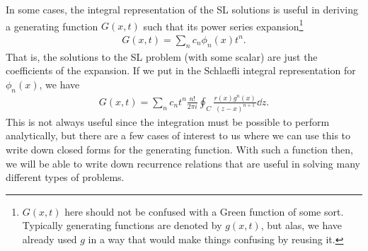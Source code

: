 In some cases, the integral representation of the SL solutions is useful in deriving a generating function $G(x,t)$ such that its power series expansion\footnote{$G(x,t)$ here should not be confused with a Green function of some sort. Typically generating functions are denoted by $g(x,t)$, but alas, we have already used $g$ in a way that would make things confusing by reusing it.}
\begin{eqnarray}
    G(x,t) = \sum_{n} c_{n} \phi_{n}(x) t^{n}
.\end{eqnarray}
That is, the solutions to the SL problem (with some scalar) are just the coefficients of the expansion.
If we put in the Schlaefli integral representation for $\phi_{n}(x)$, we have
\begin{eqnarray}
    G(x,t) = \sum_{n} c_{n} t^{n} \frac{n!}{2 \pi i} \oint_{C} \frac{r(x) g^{n}(x)}{(z - x)^{n+1}} \dd{z}
.\end{eqnarray}
This is not always useful since the integration must be possible to perform analytically, but there are a few cases of interest to us where we can use this to write down closed forms for the generating function.
With such a function then, we will be able to write down recurrence relations that are useful in solving many different types of problems.





